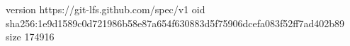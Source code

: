 version https://git-lfs.github.com/spec/v1
oid sha256:1e9d1589c0d721986b58e87a654f630883d5f75906dcefa083f52ff7ad402b89
size 174916

